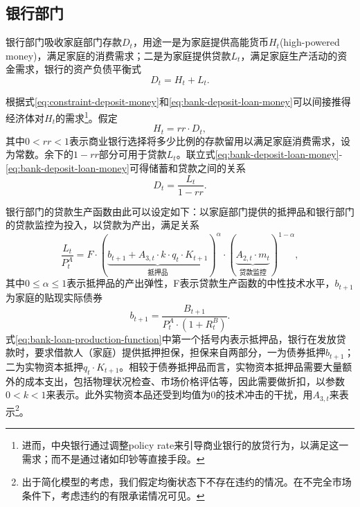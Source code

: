 \subsection{银行部门}
银行部门吸收家庭部门存款$D_t$，用途一是为家庭提供高能货币$H_t$(high-powered money)，满足家庭的消费需求；二是为家庭提供贷款$L_t$，满足家庭生产活动的资金需求，银行的资产负债平衡式
\begin{equation}
\label{eq:bank-deposit-loan-money}
D_t = H_t + L_t.
\end{equation}

根据式\eqref{eq:constraint-deposit-money}和\eqref{eq:bank-deposit-loan-money}可以间接推得经济体对$H_t$的需求\footnote{进而，中央银行通过调整policy rate来引导商业银行的放贷行为，以满足这一需求；而不是通过诸如印钞等直接手段。}。假定
\begin{equation}
\label{eq:fractional-reserve-deposits-ratio}
H_t = rr \cdot D_t,
\end{equation}
其中$0<rr<1$表示商业银行选择将多少比例的存款留用以满足家庭消费需求，设为常数。余下的$1-rr$部分可用于贷款$L_t$。联立式\eqref{eq:bank-deposit-loan-money}-\eqref{eq:bank-deposit-loan-money}可得储蓄和贷款之间的关系
\begin{equation}
\label{eq:bank-deposit-loan}
D_t = \frac{L_t}{1-rr}.
\end{equation}

银行部门的贷款生产函数由此可以设定如下：以家庭部门提供的抵押品和银行部门的贷款监控为投入，以贷款为产出，满足关系
\begin{equation}
\label{eq:bank-loan-production-function}
\frac{L_t}{P_t^A} = F \cdot \left(
\underbrace{b_{t+1} + A_{3,t} \cdot k \cdot q_t \cdot K_{t+1}}_{\text{抵押品}}
\right)^{\alpha} \cdot
\left(
\underbrace{A_{2,t} \cdot m_t}_{\text{贷款监控}}
\right)^{1-\alpha},
\end{equation}
其中$0\le \alpha \le 1$表示抵押品的产出弹性，F表示贷款生产函数的中性技术水平，$b_{t+1}$为家庭的贴现实际债券
\begin{equation}
\label{eq:real-discounted-bonds}
b_{t+1} = \frac{B_{t+1}}{P_t^A \cdot \left(1+R_t^B\right)}.
\end{equation}
式\eqref{eq:bank-loan-production-function}中第一个括号内表示抵押品，银行在发放贷款时，要求借款人（家庭）提供抵押担保，担保来自两部分，一为债券抵押$b_{t+1}$；二为实物资本抵押$q_t \cdot K_{t+1}$。相较于债券抵押品而言，实物资本抵押品需要大量额外的成本支出，包括物理状况检查、市场价格评估等，因此需要做折扣，以参数$0<k<1$来表示。此外实物资本品还受到均值为$0$的技术冲击的干扰，用$A_{3,t}$来表示\footnote{出于简化模型的考虑，我们假定均衡状态下不存在违约的情况。在不完全市场条件下，考虑违约的有限承诺情况可见\citep{Kocherlakota:1996jk}。}。

